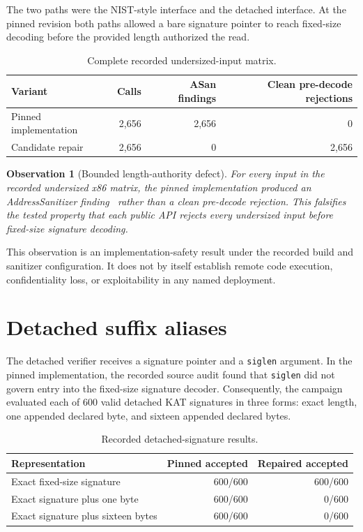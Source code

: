 \documentclass[11pt]{article}
\newtheorem{observation}{Observation}
\newcommand{\code}[1]{\texttt{#1}}
\begin{document}
The two paths were the NIST-style  interface and the
detached  interface.  At the pinned revision both paths
allowed a bare signature pointer to reach fixed-size decoding before the
provided length authorized the read.

\begin{table}[ht]
\centering
\caption{Complete recorded undersized-input matrix.}
\label{tab:undersized}
\begin{tabular}{lrrr}
\toprule
Variant & Calls & ASan findings & Clean pre-decode rejections \\
\midrule
Pinned implementation & 2,656 & 2,656 & 0 \\
Candidate repair       & 2,656 & 0     & 2,656 \\
\bottomrule
\end{tabular}
\end{table}

\begin{observation}[Bounded length-authority defect]
For every input in the recorded undersized x86 matrix, the pinned
implementation produced an AddressSanitizer
finding~\cite{addresssanitizer-2012} rather than a clean
pre-decode rejection.  This falsifies the tested property that each public API
rejects every undersized input before fixed-size signature decoding.
\end{observation}

This observation is an implementation-safety result under the recorded build
and sanitizer configuration.  It does not by itself establish remote code
execution, confidentiality loss, or exploitability in any named deployment.

\section{Detached suffix aliases}

The detached verifier receives a signature pointer and a \code{siglen}
argument.  In the pinned implementation, the recorded source audit found that
\code{siglen} did not govern entry into the fixed-size signature decoder.
Consequently, the campaign evaluated each of 600 valid detached KAT
signatures in three forms: exact length, one appended declared byte, and
sixteen appended declared bytes.

\begin{table}[ht]
\centering
\caption{Recorded detached-signature results.}
\label{tab:trailing}
\begin{tabular}{lrr}
\toprule
Representation & Pinned accepted & Repaired accepted \\
\midrule
Exact fixed-size signature       & 600/600   & 600/600 \\
Exact signature plus one byte    & 600/600   & 0/600 \\
Exact signature plus sixteen bytes & 600/600 & 0/600 \\
\bottomrule
\end{tabular}
\end{table}
\end{document}
